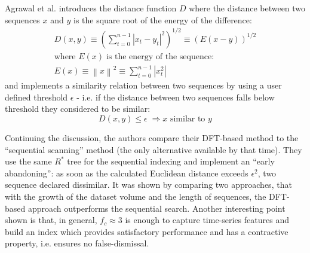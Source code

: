 Agrawal et al. introduces the distance function $D$ where the distance between two sequences $x$ and $y$ is the square root of the energy of the difference:
\begin{align}
D(x,y) \equiv \left( \sum_{t=0}^{n-1} \left| x_{t} - y_{t} \right| ^{2} \right) ^{1/2}
       \equiv \left( E(x-y) \right) ^{1/2} \\
\text{where } E(x) \; \text{is the energy of the sequence:} \nonumber \\
E(x) \equiv \left\| x \right\| ^{2} \equiv \sum_{t=0}^{n-1} \left| x_{t} ^{2} \right|
\label{eq:dft_distance}
\end{align}
and implements a similarity relation between two sequences by using a user defined threshold $\epsilon$ - i.e. if the distance between two sequences falls below threshold they considered to be similar:
\begin{equation}
D(x,y) \leq \epsilon \; \Rightarrow \text{$x$ similar to $y$}
\label{eq:dft_similarity_dft}
\end{equation}

Continuing the discussion, the authors compare their DFT-based method to the ``sequential scanning'' method (the only alternative available by that time). They use the same $R^{*}$ tree for the sequential indexing and implement an ``early abandoning'': as soon as the calculated Euclidean distance exceeds $\epsilon^{2}$, two sequence declared dissimilar. It was shown by comparing two approaches, that with the growth of the dataset volume and the length of sequences, the DFT-based approach outperforms the sequential search. Another interesting point shown is that, in general, $f_{c} \approx 3$ is enough to capture time-series features and build an index which provides satisfactory performance and has a contractive property, i.e. ensures no false-dismissal.
